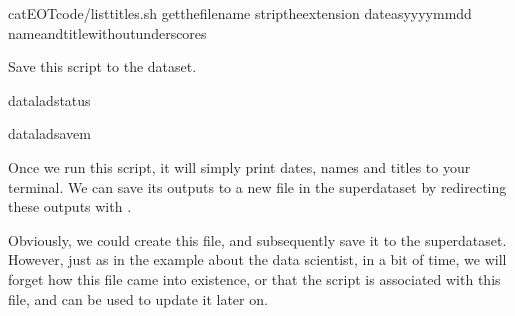 \begin{sphinxVerbatim}[commandchars=\\\{\}]
cat\PYGZlt{}\PYGZlt{}EOT\PYGZgt{}code/list\PYGZus{}titles.sh
getthefilename
striptheextension
dateasyyyy\PYGZhy{}mm\PYGZhy{}dd
nameandtitlewithoutunderscores
\end{sphinxVerbatim}

\sphinxAtStartPar
Save this script to the dataset.

\begin{sphinxVerbatim}[commandchars=\\\{\}]
dataladstatus
\end{sphinxVerbatim}

\begin{sphinxVerbatim}[commandchars=\\\{\}]
dataladsave\PYGZhy{}m
\end{sphinxVerbatim}

\sphinxAtStartPar
Once we run this script, it will simply print dates, names and titles to
your terminal. We can save its outputs to a new file
 in the superdataset by redirecting these
outputs with .

\sphinxAtStartPar
Obviously, we could create this file, and subsequently save it to the superdataset.
However, just as in the example about the data scientist,
in a bit of time, we will forget how this file came into existence, or
that the script  is associated with this file, and
can be used to update it later on.

